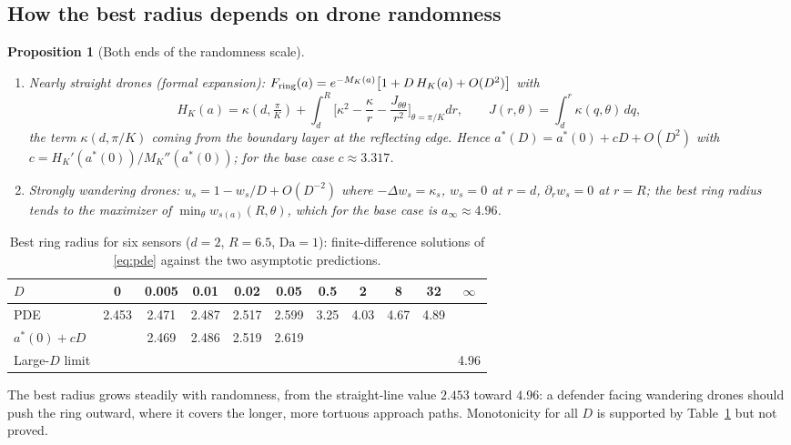 \documentclass[11pt]{article}
\newtheorem{proposition}[theorem]{Proposition}
\theoremstyle{remark}
\newcommand{\Da}{\mathrm{Da}}
\begin{document}
\subsection{How the best radius depends on drone randomness}
\begin{proposition}[Both ends of the randomness scale]\label{prop:radius}
\begin{enumerate}[label=(\alph*)]
\item \emph{Nearly straight drones (formal expansion):}
$F_{\rm ring}(a)=e^{-M_K(a)}\big[1+D\,H_K(a)+O(D^2)\big]$ with
\[
H_K(a)=\kappa(d,\tfrac{\pi}{K})+\int_d^R\Big[\kappa^2-\frac{\kappa}{r}
-\frac{J_{\theta\theta}}{r^2}\Big]_{\theta=\pi/K}dr,\qquad
J(r,\theta)=\int_d^r\kappa(q,\theta)\,dq,
\]
the term $\kappa(d,\pi/K)$ coming from the boundary layer at the reflecting edge. Hence
$a^*(D)=a^*(0)+cD+O(D^2)$ with $c=H_K'(a^*(0))/M_K''(a^*(0))$; for the base case
$c\approx3.317$.
\item \emph{Strongly wandering drones:} $u_s=1-w_s/D+O(D^{-2})$ where $-\Delta w_s=\kappa_s$,
$w_s=0$ at $r=d$, $\partial_rw_s=0$ at $r=R$; the best ring radius tends to the maximizer of
$\min_\theta w_{s(a)}(R,\theta)$, which for the base case is $a_\infty\approx4.96$.
\end{enumerate}
\end{proposition}

\begin{table}[h]\centering
\caption{Best ring radius for six sensors ($d=2$, $R=6.5$, $\Da=1$): finite-difference
solutions of \eqref{eq:pde} against the two asymptotic predictions.}\label{tab:radius}
\begin{tabular}{@{}lcccccccccc@{}}\toprule
$D$ & 0 & 0.005 & 0.01 & 0.02 & 0.05 & 0.5 & 2 & 8 & 32 & $\infty$\\\midrule
PDE & 2.453 & 2.471 & 2.487 & 2.517 & 2.599 & 3.25 & 4.03 & 4.67 & 4.89 & \\
$a^*(0)+cD$ & & 2.469 & 2.486 & 2.519 & 2.619 & & & & & \\
Large-$D$ limit & & & & & & & & & & 4.96\\\bottomrule
\end{tabular}
\end{table}
The best radius grows steadily with randomness, from the straight-line value $2.453$ toward
$4.96$: a defender facing wandering drones should push the ring outward, where it covers the
longer, more tortuous approach paths. Monotonicity for all $D$ is supported by
Table~\ref{tab:radius} but not proved.
\end{document}
